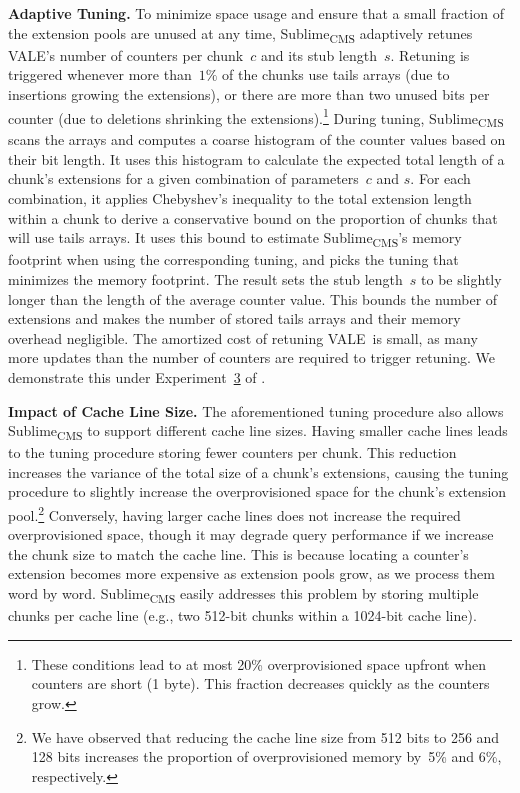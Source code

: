 \documentclass[sigconf]{acmart}
\newcommand{\sketch}{Sublime}
\newcommand{\sketchcms}{\sketch\textsubscript{CMS}\xspace}
\newcommand{\counterencodingabbrv}{VALE}
\begin{document}
\textbf{Adaptive Tuning.}
To minimize space usage and ensure that a small fraction of the extension pools are unused at any time, \sketchcms adaptively retunes \counterencodingabbrv's number of counters per chunk~$c$ and its stub length~$s$.
Retuning is triggered whenever more than~$1\%$ of the chunks use tails arrays (due to insertions growing the extensions), or there are more than two unused bits per counter (due to deletions shrinking the extensions).\footnote{
    These conditions lead to at most 20\% overprovisioned space upfront when counters are short (1 byte).
    This fraction decreases quickly as the counters grow.
}
During tuning, \sketchcms scans the arrays and computes a coarse histogram of the counter values based on their bit length.
It uses this histogram to calculate the expected total length of a chunk's extensions for a given combination of parameters~$c$ and $s$.
For each combination, it applies Chebyshev's inequality to the total extension length within a chunk to derive a conservative bound on the proportion of chunks that will use tails arrays.
It uses this bound to estimate \sketchcms's memory footprint when using the corresponding tuning, and picks the tuning that minimizes the memory footprint.
The result sets the stub length~$s$ to be slightly longer than the length of the average counter value.
This bounds the number of extensions and makes the number of stored tails arrays and their memory overhead negligible.
The amortized cost of retuning \counterencodingabbrv\ is small, as many more updates than the number of counters are required to trigger retuning.
We demonstrate this under Experiment~\hyperlink{experiment:vale_tuning}{3} of .

\textbf{Impact of Cache Line Size.}
The aforementioned tuning procedure also allows \sketchcms to support different cache line sizes.
Having smaller cache lines leads to the tuning procedure storing fewer counters per chunk.
This reduction increases the variance of the total size of a chunk's extensions, causing the tuning procedure to slightly increase the overprovisioned space for the chunk's extension pool.\footnote{
    We have observed that reducing the cache line size from 512 bits to 256 and 128 bits increases the proportion of overprovisioned memory by~5\% and 6\%, respectively.
} 
Conversely, having larger cache lines does not increase the required overprovisioned space, though it may degrade query performance if we increase the chunk size to match the cache line.
This is because locating a counter's extension becomes more expensive as extension pools grow, as we process them word by word.
\sketchcms easily addresses this problem by storing multiple chunks per cache line (e.g., two 512-bit chunks within a 1024{\nobreakdash-}bit cache line).
\end{document}
